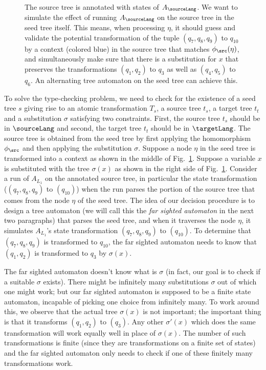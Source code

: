 \begin{figure}
        \caption{ The source tree is annotated with states of
            $A_{\sourceLang}$. We want to simulate the effect of running
            $A_{\sourceLang}$ on the source tree in the seed tree itself. This
            means, when processing $\eta$, it should guess and
            validate the potential transformation of the tuple $(q_7,
            q_8, q_9)$ to $q_{10}$ by a context (colored blue) in the
            source tree that matches $\phi_{\src}(\eta)$, and simultaneously
            make sure that there is a substitution for $x$ that
            preserves the transformations $(q_1, q_2)$ to $q_3 $ as
            well as $(q_4, q_5)$ to $q_6 $. An alternating tree
            automaton on the seed tree can achieve this.
	}\label{fig:proofOutline}
\end{figure}

To solve the type-checking problem, we need to check for the existence
of a seed tree $s$ giving rise to an atomic transformation $T_s$, a
source tree $t_s$, a target tree $t_t$ and a substitution $\sigma$
satisfying two constraints. First, the source tree $t_s$ should be in
$\sourceLang$ and second, the target tree $t_t$ should be in $\targetLang$. The source
tree is obtained from the seed tree by first applying the homomorphism
$\phi_{\src}$ and then applying the substitution $\sigma$.
Suppose a node $\eta$ in the seed tree is transformed into a context
as shown in the middle of Fig.~\ref{fig:proofOutline}. Suppose a
variable $x$
is substituted with the tree $\sigma(x)$ as shown in the right side of
Fig.~\ref{fig:proofOutline}. Consider a run of $A_{L_{1}}$ on the
annotated source tree, in particular the state transformation ($(q_7,q_8,q_9)$
to $(q_{10})$) when the run parses the portion of the source tree that
comes from the node $\eta$ of the seed tree. The idea of our decision
procedure is to design a tree automaton (we will call this the
\emph{far sighted automaton} in the next two paragraphs) that parses
the seed tree, and when it traverses the node $\eta$, it simulates
$A_{L_{1}}$'s state transformation $(q_7,q_8,q_9)$ to $(q_{10})$. To
determine that $(q_7,q_8,q_9)$ is transformed to $q_{10}$, the far
sighted automaton needs to know that $(q_1,q_2)$ is transformed to
$q_3$ by $\sigma(x)$.

The far sighted automaton doesn't know what is $\sigma$ (in fact, our
goal is to check if a suitable $\sigma$ exists). There might be
infinitely many substitutions $\sigma$ out of which one might work;
but our far sighted automaton is supposed to be a finite state
automaton, incapable of picking one choice from infinitely many. To
work around this, we observe that the actual tree $\sigma(x)$ is not
important; the important thing is that it transforms $(q_1,q_2)$ to
$(q_3)$. Any other $\sigma'(x)$ which does the same transformation
will work equally well in place of $\sigma(x)$. The number of such
transformations is finite (since they are transformations on a finite
set of states) and the far sighted automaton only needs to check if
one of these finitely many transformations work.


